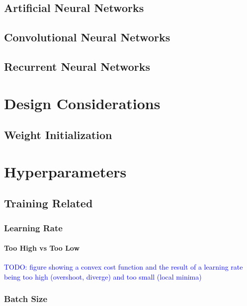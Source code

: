 \section{Artificial Neural Networks}

\section{Convolutional Neural Networks}

\section{Recurrent Neural Networks}

\chapter{Design Considerations}

\section{Weight Initialization}





\chapter{Hyperparameters}

\section{Training Related}

\subsection{Learning Rate}

\subsubsection{Too High vs Too Low}

\textcolor{blue}{TODO: figure showing a convex cost function and the result of a learning rate being too high (overshoot, diverge) and too small (local minima)}

\subsection{Batch Size}

